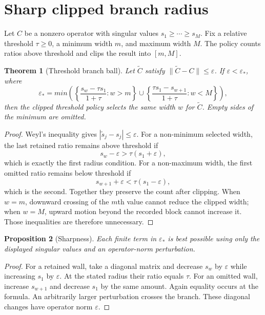 \documentclass[12pt]{article}
\newtheorem{theorem}{Theorem}
\newtheorem{proposition}[theorem]{Proposition}
\begin{document}
\section{Sharp clipped branch radius}
Let $C$ be a nonzero operator with singular values
$s_1\geq\cdots\geq s_M$.  Fix a relative threshold $\tau\geq0$, a minimum
width $m$, and maximum width $M$.  The policy counts ratios above threshold
and clips the result into $[m,M]$.

\begin{theorem}[Threshold branch ball]\label{thm:branch}
Let $\widetilde C$ satisfy $\|\widetilde C-C\|\leq\varepsilon$.  If
$\varepsilon<\varepsilon_*$, where
\[
 \varepsilon_*=min\left(
 \left\{\frac{s_w-\tau s_1}{1+\tau}:w>m\right\}
 \cup
 \left\{\frac{\tau s_1-s_{w+1}}{1+\tau}:w<M\right\}
 \right),
\]
then the clipped threshold policy selects the same width $w$ for
$\widetilde C$.  Empty sides of the minimum are omitted.
\end{theorem}

\begin{proof}
Weyl's inequality gives
$|\widetilde s_j-s_j|\leq\varepsilon$.  For a non-minimum selected width,
the last retained ratio remains above threshold if
\[
 s_w-\varepsilon>\tau(s_1+\varepsilon),
\]
which is exactly the first radius condition.  For a non-maximum width, the
first omitted ratio remains below threshold if
\[
 s_{w+1}+\varepsilon<\tau(s_1-\varepsilon),
\]
which is the second.  Together they preserve the count after clipping.
When $w=m$, downward crossing of the $m$th value cannot reduce the clipped
width; when $w=M$, upward motion beyond the recorded block cannot increase
it.  Those inequalities are therefore unnecessary.
\end{proof}

\begin{proposition}[Sharpness]\label{prop:sharp}
Each finite term in $\varepsilon_*$ is best possible using only the displayed
singular values and an operator-norm perturbation.
\end{proposition}
\begin{proof}
For a retained wall, take a diagonal matrix and decrease $s_w$ by
$\varepsilon$ while increasing $s_1$ by $\varepsilon$.  At the stated radius
their ratio equals $\tau$.  For an omitted wall, increase $s_{w+1}$ and
decrease $s_1$ by the same amount.  Again equality occurs at the formula.
An arbitrarily larger perturbation crosses the branch.  These diagonal
changes have operator norm $\varepsilon$.
\end{proof}
\end{document}
